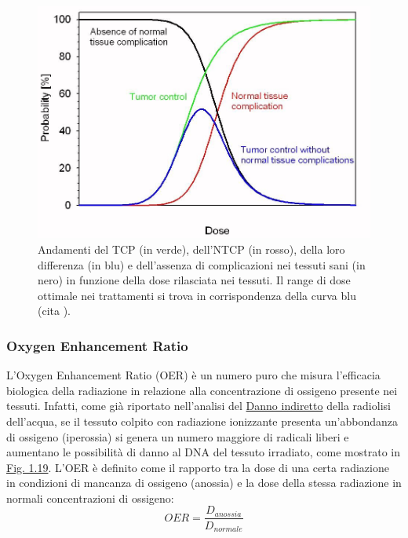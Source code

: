 \documentclass[12pt,a4paper,twoside]{report}
\begin{document}
	\begin{figure}[H]
		\centering
		\includegraphics[width=0.9\linewidth]{tcp.jpg}
		\caption{Andamenti del TCP (in verde), dell'NTCP (in rosso), della loro differenza (in blu) e dell'assenza di complicazioni nei tessuti sani (in nero) in funzione della dose rilasciata nei tessuti. Il range di dose ottimale nei trattamenti si trova in corrispondenza della curva blu (cita
			).}
		\label{fig:tcp}
	\end{figure}

	\subsubsection{Oxygen Enhancement Ratio}\label{par:oer}
	L'Oxygen Enhancement Ratio (OER) è un numero puro che misura l'efficacia biologica della radiazione in relazione alla concentrazione di ossigeno presente nei tessuti. Infatti, come già riportato nell'analisi del \hyperref[par:danno_indiretto]{Danno indiretto} della radiolisi dell'acqua, se il tessuto colpito con radiazione ionizzante presenta un'abbondanza di ossigeno (iperossia) si genera un numero maggiore di radicali liberi e aumentano le possibilità di danno al DNA del tessuto irradiato, come mostrato in \hyperref[fig:oer_survival]{Fig. 1.19}. L'OER è definito come il rapporto tra la dose di una certa radiazione in condizioni di mancanza di ossigeno (anossia) e la dose della stessa radiazione in normali concentrazioni di ossigeno:
	\begin{equation}
		OER=\frac{D_{anossia}}{D_{normale}}
		\label{eq:oer}
	\end{equation}
	
\end{document}
